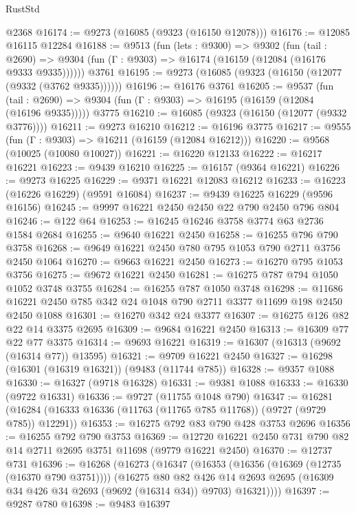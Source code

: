 \begin{lexlean}{RustStd}
\begin{coremodule}
{\begin{coremodule}
{{{{{{{{{{{{{{{{{{{{{{{{{{{{{{{{{{{{{{{{{{{{{{{{{{{{{{{    @2368
@16174 := @9273 (@16085 (@9323 (@16150 @12078)))
@16176 := @12085 @16115 @12284
@16188 := @9513
    (fun (lets : @9300) =>
    @9302
      (fun (tail : @2690) =>
      @9304 (fun (Γ : @9303) => @16174 (@16159 (@12084 (@16176 @9333 @9335))))))
    @3761
@16195 := @9273 (@16085 (@9323 (@16150 (@12077 (@9332 (@3762 @9335))))))
@16196 := @16176 @3761
@16205 := @9537
    (fun (tail : @2690) => @9304 (fun (Γ : @9303) => @16195 (@16159 (@12084 (@16196 @9335)))))
    @3775
@16210 := @16085 (@9323 (@16150 (@12077 (@9332 @3776))))
@16211 := @9273 @16210
@16212 := @16196 @3775
@16217 := @9555 (fun (Γ : @9303) => @16211 (@16159 (@12084 @16212)))
@16220 := @9568 (@10025 (@10080 @10027))
@16221 := @16220 @12133
@16222 := @16217 @16221
@16223 := @9439 @16210
@16225 := @16157 (@9364 @16221)
@16226 := @9273 @16225
@16229 := @9371 @16221 @12083 @16212
@16233 := @16223 (@16226 @16229) (@9591 @16084)
@16237 := @9439 @16225 @16229 (@9596 @16156)
@16245 := @9997 @16221 @2450 @2450 @22 @790 @2450 @796 @804
@16246 := @122 @64
@16253 := @16245 @16246 @3758 @3774 @63 @2736 @1584 @2684
@16255 := @9640 @16221 @2450
@16258 := @16255 @796 @790 @3758
@16268 := @9649 @16221 @2450 @780 @795 @1053 @790 @2711 @3756 @2450 @1064
@16270 := @9663 @16221 @2450
@16273 := @16270 @795 @1053 @3756
@16275 := @9672 @16221 @2450
@16281 := @16275 @787 @794 @1050 @1052 @3748 @3755
@16284 := @16255 @787 @1050 @3748
@16298 := @11686 @16221 @2450 @785 @342 @24 @1048 @790 @2711 @3377 @11699 @198 @2450 @2450 @1088
@16301 := @16270 @342 @24 @3377
@16307 := @16275 @126 @82 @22 @14 @3375 @2695
@16309 := @9684 @16221 @2450
@16313 := @16309 @77 @22 @77 @3375
@16314 := @9693 @16221
@16319 := @16307 (@16313 (@9692 (@16314 @77)) @13595)
@16321 := @9709 @16221 @2450
@16327 := @16298 (@16301 (@16319 @16321)) (@9483 (@11744 @785))
@16328 := @9357 @1088
@16330 := @16327 (@9718 @16328)
@16331 := @9381 @1088
@16333 := @16330 (@9722 @16331)
@16336 := @9727 (@11755 @1048 @790)
@16347 := @16281 (@16284 (@16333 @16336 (@11763 (@11765 @785 @11768)) (@9727 (@9729 @785)) @12291))
@16353 := @16275 @792 @83 @790 @428 @3753 @2696
@16356 := @16255 @792 @790 @3753
@16369 := @12720 @16221 @2450 @731 @790 @82 @14 @2711 @2695 @3751 @11698 (@9779 @16221 @2450)
@16370 := @12737 @731
@16396 := @16268
    (@16273
      (@16347
        (@16353
          (@16356 (@16369 (@12735 (@16370 @790 @3751))))
          (@16275
            @80
            @82
            @426
            @14
            @2693
            @2695
            (@16309 @34 @426 @34 @2693 (@9692 (@16314 @34)) @9703)
            @16321))))
@16397 := @9287 @780
@16398 := @9483 @16397
}}}}}}}}}}}}}}}}}}}}}}}}}}}}}}}}}}}}}}}}}}}}}}}}}}}}}}}
\end{coremodule}}
\end{coremodule}
\end{lexlean}
